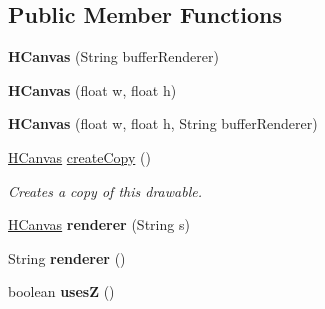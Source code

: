 \subsection*{Public Member Functions}
\begin{DoxyCompactItemize}
\item 
\hypertarget{classhype_1_1extended_1_1drawable_1_1_h_canvas_a7b9bc510402e97cf2065feb9a8e9394f}{{\bfseries H\-Canvas} (String buffer\-Renderer)}\label{classhype_1_1extended_1_1drawable_1_1_h_canvas_a7b9bc510402e97cf2065feb9a8e9394f}

\item 
\hypertarget{classhype_1_1extended_1_1drawable_1_1_h_canvas_abc98d0a9de6a3f94e23d427f43907bbe}{{\bfseries H\-Canvas} (float w, float h)}\label{classhype_1_1extended_1_1drawable_1_1_h_canvas_abc98d0a9de6a3f94e23d427f43907bbe}

\item 
\hypertarget{classhype_1_1extended_1_1drawable_1_1_h_canvas_ac84b924727cd762f2ae956ee9416ecdd}{{\bfseries H\-Canvas} (float w, float h, String buffer\-Renderer)}\label{classhype_1_1extended_1_1drawable_1_1_h_canvas_ac84b924727cd762f2ae956ee9416ecdd}

\item 
\hyperlink{classhype_1_1extended_1_1drawable_1_1_h_canvas}{H\-Canvas} \hyperlink{classhype_1_1extended_1_1drawable_1_1_h_canvas_accd7a62c63d88f0f5bbae6172190d22f}{create\-Copy} ()
\begin{DoxyCompactList}\small\item\em Creates a copy of this drawable. \end{DoxyCompactList}\item 
\hypertarget{classhype_1_1extended_1_1drawable_1_1_h_canvas_ac7d3d19520a2ede3c373afbda2b23a67}{\hyperlink{classhype_1_1extended_1_1drawable_1_1_h_canvas}{H\-Canvas} {\bfseries renderer} (String s)}\label{classhype_1_1extended_1_1drawable_1_1_h_canvas_ac7d3d19520a2ede3c373afbda2b23a67}

\item 
\hypertarget{classhype_1_1extended_1_1drawable_1_1_h_canvas_ae9334f59e3958ecc7f6995b1b90227bf}{String {\bfseries renderer} ()}\label{classhype_1_1extended_1_1drawable_1_1_h_canvas_ae9334f59e3958ecc7f6995b1b90227bf}

\item 
\hypertarget{classhype_1_1extended_1_1drawable_1_1_h_canvas_af15935934d30de3dfdace024458d3743}{boolean {\bfseries uses\-Z} ()}\label{classhype_1_1extended_1_1drawable_1_1_h_canvas_af15935934d30de3dfdace024458d3743}


\end{DoxyCompactItemize}
